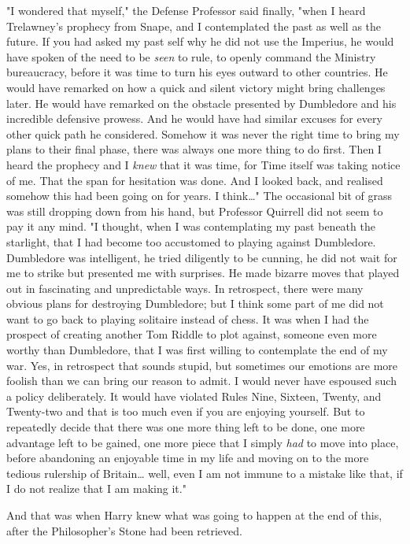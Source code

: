 "I wondered that myself," the Defense Professor said finally, "when I heard
Trelawney's prophecy from Snape, and I contemplated the past as well as the
future. If you had asked my past self why he did not use the Imperius, he would
have spoken of the need to be \emph{seen} to rule, to openly command the
Ministry bureaucracy, before it was time to turn his eyes outward to other
countries. He would have remarked on how a quick and silent victory might bring
challenges later. He would have remarked on the obstacle presented by
Dumbledore and his incredible defensive prowess. And he would have had similar
excuses for every other quick path he considered. Somehow it was never the
right time to bring my plans to their final phase, there was always one more
thing to do first. Then I heard the prophecy and I \emph{knew} that it was
time, for Time itself was taking notice of me. That the span for hesitation was
done. And I looked back, and realised somehow this had been going on for years.
I think{\ldots}" The occasional bit of grass was still dropping down from his
hand, but Professor Quirrell did not seem to pay it any mind. "I thought, when
I was contemplating my past beneath the starlight, that I had become too
accustomed to playing against Dumbledore. Dumbledore was intelligent, he tried
diligently to be cunning, he did not wait for me to strike but presented me
with surprises. He made bizarre moves that played out in fascinating and
unpredictable ways. In retrospect, there were many obvious plans for destroying
Dumbledore; but I think some part of me did not want to go back to playing
solitaire instead of chess. It was when I had the prospect of creating another
Tom Riddle to plot against, someone even more worthy than Dumbledore, that I
was first willing to contemplate the end of my war. Yes, in retrospect that
sounds stupid, but sometimes our emotions are more foolish than we can bring
our reason to admit. I would never have espoused such a policy deliberately. It
would have violated Rules Nine, Sixteen, Twenty, and Twenty-two and that is too
much even if you are enjoying yourself. But to repeatedly decide that there was
one more thing left to be done, one more advantage left to be gained, one more
piece that I simply \emph{had} to move into place, before abandoning an
enjoyable time in my life and moving on to the more tedious rulership of
Britain{\ldots} well, even I am not immune to a mistake like that, if I do not
realize that I am making it."

And that was when Harry knew what was going to happen at the end of this, after
the Philosopher's Stone had been retrieved.


